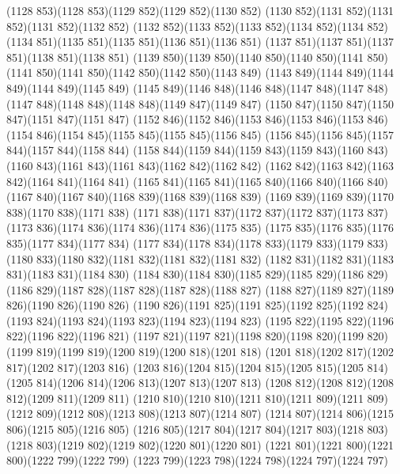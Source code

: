 \cpath (1128 853)(1128 853)(1129 852)(1129 852)(1130 852)
\cpath (1130 852)(1131 852)(1131 852)(1131 852)(1132 852)
\cpath (1132 852)(1133 852)(1133 852)(1134 852)(1134 852)
\cpath (1134 851)(1135 851)(1135 851)(1136 851)(1136 851)
\cpath (1137 851)(1137 851)(1137 851)(1138 851)(1138 851)
\cpath (1139 850)(1139 850)(1140 850)(1140 850)(1141 850)
\cpath (1141 850)(1141 850)(1142 850)(1142 850)(1143 849)
\cpath (1143 849)(1144 849)(1144 849)(1144 849)(1145 849)
\cpath (1145 849)(1146 848)(1146 848)(1147 848)(1147 848)
\cpath (1147 848)(1148 848)(1148 848)(1149 847)(1149 847)
\cpath (1150 847)(1150 847)(1150 847)(1151 847)(1151 847)
\cpath (1152 846)(1152 846)(1153 846)(1153 846)(1153 846)
\cpath (1154 846)(1154 845)(1155 845)(1155 845)(1156 845)
\cpath (1156 845)(1156 845)(1157 844)(1157 844)(1158 844)
\cpath (1158 844)(1159 844)(1159 843)(1159 843)(1160 843)
\cpath (1160 843)(1161 843)(1161 843)(1162 842)(1162 842)
\cpath (1162 842)(1163 842)(1163 842)(1164 841)(1164 841)
\cpath (1165 841)(1165 841)(1165 840)(1166 840)(1166 840)
\cpath (1167 840)(1167 840)(1168 839)(1168 839)(1168 839)
\cpath (1169 839)(1169 839)(1170 838)(1170 838)(1171 838)
\cpath (1171 838)(1171 837)(1172 837)(1172 837)(1173 837)
\cpath (1173 836)(1174 836)(1174 836)(1174 836)(1175 835)
\cpath (1175 835)(1176 835)(1176 835)(1177 834)(1177 834)
\cpath (1177 834)(1178 834)(1178 833)(1179 833)(1179 833)
\cpath (1180 833)(1180 832)(1181 832)(1181 832)(1181 832)
\cpath (1182 831)(1182 831)(1183 831)(1183 831)(1184 830)
\cpath (1184 830)(1184 830)(1185 829)(1185 829)(1186 829)
\cpath (1186 829)(1187 828)(1187 828)(1187 828)(1188 827)
\cpath (1188 827)(1189 827)(1189 826)(1190 826)(1190 826)
\cpath (1190 826)(1191 825)(1191 825)(1192 825)(1192 824)
\cpath (1193 824)(1193 824)(1193 823)(1194 823)(1194 823)
\cpath (1195 822)(1195 822)(1196 822)(1196 822)(1196 821)
\cpath (1197 821)(1197 821)(1198 820)(1198 820)(1199 820)
\cpath (1199 819)(1199 819)(1200 819)(1200 818)(1201 818)
\cpath (1201 818)(1202 817)(1202 817)(1202 817)(1203 816)
\cpath (1203 816)(1204 815)(1204 815)(1205 815)(1205 814)
\cpath (1205 814)(1206 814)(1206 813)(1207 813)(1207 813)
\cpath (1208 812)(1208 812)(1208 812)(1209 811)(1209 811)
\cpath (1210 810)(1210 810)(1211 810)(1211 809)(1211 809)
\cpath (1212 809)(1212 808)(1213 808)(1213 807)(1214 807)
\cpath (1214 807)(1214 806)(1215 806)(1215 805)(1216 805)
\cpath (1216 805)(1217 804)(1217 804)(1217 803)(1218 803)
\cpath (1218 803)(1219 802)(1219 802)(1220 801)(1220 801)
\cpath (1221 801)(1221 800)(1221 800)(1222 799)(1222 799)
\cpath (1223 799)(1223 798)(1224 798)(1224 797)(1224 797)
